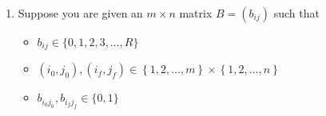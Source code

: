 \documentclass[10pt,notitlepage]{amsart}
\begin{document}
\lstset{frameround=fttt,frame=trBL,showstringspaces=false}

\vskip 12pt

\begin{enumerate}
\item Suppose you are given an $m\times n$ matrix $B=(b_{ij})$ such that
\begin{itemize}
  \item $b_{ij}\in\{0,1,2,3, \ldots, R\}$  
  \item $(i_0,j_0), (i_f,j_f)\in \left\{1,2,\ldots,m\right\}\times     \left\{1,2,\ldots, n\right\}$ 
\item  $b_{i_0j_0},b_{i_fj_f}\in\{0,1\}$
\end{itemize}


\end{enumerate}
\end{document}

